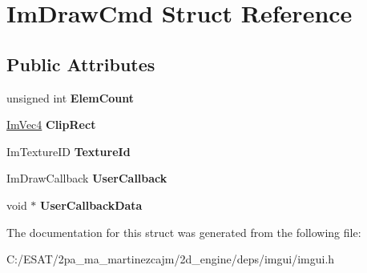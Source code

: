 \hypertarget{struct_im_draw_cmd}{}\section{Im\+Draw\+Cmd Struct Reference}
\label{struct_im_draw_cmd}
\subsection*{Public Attributes}
\begin{DoxyCompactItemize}
\item 
\mbox{\label{struct_im_draw_cmd_aafe2532964fb1f6905d67d84dd3e8730}} 
unsigned int {\bfseries Elem\+Count}
\item 
\mbox{\label{struct_im_draw_cmd_a838918f420ff81cb8dc7265077592daa}} 
\hyperlink{struct_im_vec4}{Im\+Vec4} {\bfseries Clip\+Rect}
\item 
\mbox{\label{struct_im_draw_cmd_a4f3b5985ece9ca6b71e7a8e7d85a82e5}} 
Im\+Texture\+ID {\bfseries Texture\+Id}
\item 
\mbox{\label{struct_im_draw_cmd_ad26dac4e939f5c4bb892cbca0f9e3af8}} 
Im\+Draw\+Callback {\bfseries User\+Callback}
\item 
\mbox{\label{struct_im_draw_cmd_ae2f5a0baf4a0b25942237b8ce6adb42d}} 
void $\ast$ {\bfseries User\+Callback\+Data}
\end{DoxyCompactItemize}


The documentation for this struct was generated from the following file\+:\begin{DoxyCompactItemize}
\item 
C\+:/\+E\+S\+A\+T/2pa\+\_\+ma\+\_\+martinezcajm/2d\+\_\+engine/deps/imgui/imgui.\+h\end{DoxyCompactItemize}
